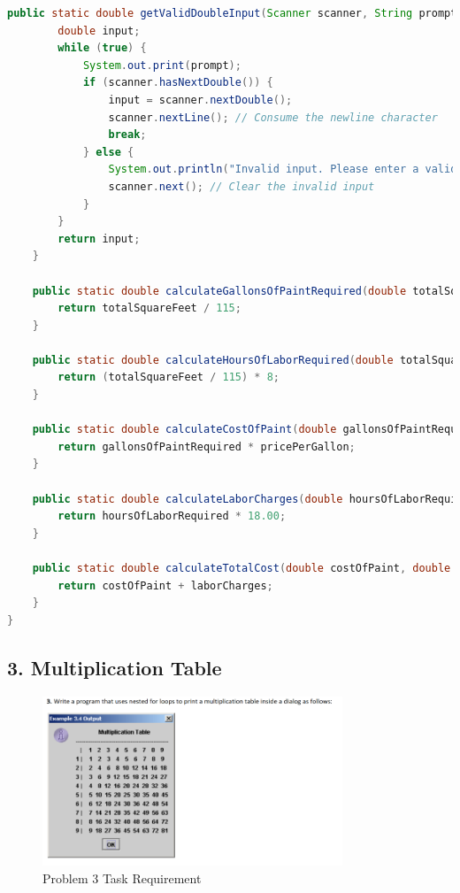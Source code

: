 \documentclass{article}
\begin{document}
\begin{lstlisting}[language=Java, caption=Challenge4.java]
    public static double getValidDoubleInput(Scanner scanner, String prompt) {
        double input;
        while (true) {
            System.out.print(prompt);
            if (scanner.hasNextDouble()) {
                input = scanner.nextDouble();
                scanner.nextLine(); // Consume the newline character
                break;
            } else {
                System.out.println("Invalid input. Please enter a valid number.");
                scanner.next(); // Clear the invalid input
            }
        }
        return input;
    }

    public static double calculateGallonsOfPaintRequired(double totalSquareFeet) {
        return totalSquareFeet / 115;
    }

    public static double calculateHoursOfLaborRequired(double totalSquareFeet) {
        return (totalSquareFeet / 115) * 8;
    }

    public static double calculateCostOfPaint(double gallonsOfPaintRequired, double pricePerGallon) {
        return gallonsOfPaintRequired * pricePerGallon;
    }

    public static double calculateLaborCharges(double hoursOfLaborRequired) {
        return hoursOfLaborRequired * 18.00;
    }

    public static double calculateTotalCost(double costOfPaint, double laborCharges) {
        return costOfPaint + laborCharges;
    }
}
\end{lstlisting}

\subsection*{3. Multiplication Table}
\begin{figure}[H]
    \centering
    \includegraphics[width=0.8\textwidth]{./Assets/Task requirements/Assignment5/3.png}
    
    \caption{Problem 3 Task Requirement}
\end{figure}
\end{document}
